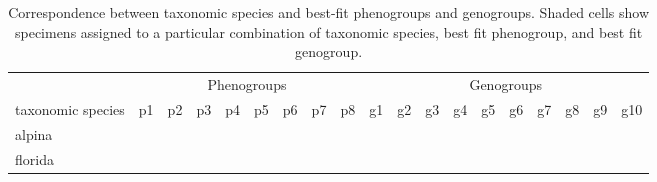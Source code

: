 \documentclass[
  11pt,
]{article}
\begin{document}
\begin{table}[H]

\caption{\label{tab:cladeVfinalSummary}Correspondence between taxonomic species and best-fit phenogroups and genogroups. Shaded cells show specimens assigned to a particular combination of taxonomic species, best fit phenogroup, and best fit genogroup.}
\centering
\fontsize{8}{10}\selectfont
\begin{tabular}[t]{>{}l|>{}l|>{}l|>{}l|>{}l|>{}l|>{}l|>{}l|>{}l||>{}l|>{}l|>{}l|>{}l|>{}l|>{}l|>{}l|>{}l|>{}l|>{}l|}
\toprule
\multicolumn{1}{c}{} & \multicolumn{8}{c}{Phenogroups} & \multicolumn{10}{c}{Genogroups} \\
\cmidrule(l{3pt}r{3pt}){2-9} \cmidrule(l{3pt}r{3pt}){10-19}
taxonomic species & p1 & p2 & p3 & p4 & p5 & p6 & p7 & p8 & g1 & g2 & g3 & g4 & g5 & g6 & g7 & g8 & g9 & g10\\
\midrule
alpina & \cellcolor[HTML]{FFFFFF}{\textcolor[HTML]{FFFFFF}{0}} & \cellcolor[HTML]{FFFFFF}{\textcolor[HTML]{FFFFFF}{0}} & \cellcolor[HTML]{BBBBBB}{\textcolor[HTML]{BBBBBB}{1}} & \cellcolor[HTML]{FFFFFF}{\textcolor[HTML]{FFFFFF}{0}} & \cellcolor[HTML]{FFFFFF}{\textcolor[HTML]{FFFFFF}{0}} & \cellcolor[HTML]{BBBBBB}{\textcolor[HTML]{BBBBBB}{1}} & \cellcolor[HTML]{BBBBBB}{\textcolor[HTML]{BBBBBB}{1}} & \cellcolor[HTML]{FFFFFF}{\textcolor[HTML]{FFFFFF}{0}} & \cellcolor[HTML]{FFFFFF}{\textcolor[HTML]{FFFFFF}{0}} & \cellcolor[HTML]{BBBBBB}{\textcolor[HTML]{BBBBBB}{1}} & \cellcolor[HTML]{FFFFFF}{\textcolor[HTML]{FFFFFF}{0}} & \cellcolor[HTML]{FFFFFF}{\textcolor[HTML]{FFFFFF}{0}} & \cellcolor[HTML]{FFFFFF}{\textcolor[HTML]{FFFFFF}{0}} & \cellcolor[HTML]{FFFFFF}{\textcolor[HTML]{FFFFFF}{0}} & \cellcolor[HTML]{FFFFFF}{\textcolor[HTML]{FFFFFF}{0}} & \cellcolor[HTML]{FFFFFF}{\textcolor[HTML]{FFFFFF}{0}} & \cellcolor[HTML]{BBBBBB}{\textcolor[HTML]{BBBBBB}{1}} & \cellcolor[HTML]{BBBBBB}{\textcolor[HTML]{BBBBBB}{1}}\\
\midrule
florida & \cellcolor[HTML]{FFFFFF}{\textcolor[HTML]{FFFFFF}{0}} & \cellcolor[HTML]{FFFFFF}{\textcolor[HTML]{FFFFFF}{0}} & \cellcolor[HTML]{BBBBBB}{\textcolor[HTML]{BBBBBB}{1}} & \cellcolor[HTML]{FFFFFF}{\textcolor[HTML]{FFFFFF}{0}} & \cellcolor[HTML]{FFFFFF}{\textcolor[HTML]{FFFFFF}{0}} & \cellcolor[HTML]{BBBBBB}{\textcolor[HTML]{BBBBBB}{1}} & \cellcolor[HTML]{FFFFFF}{\textcolor[HTML]{FFFFFF}{0}} & \cellcolor[HTML]{FFFFFF}{\textcolor[HTML]{FFFFFF}{0}} & \cellcolor[HTML]{FFFFFF}{\textcolor[HTML]{FFFFFF}{0}} & \cellcolor[HTML]{FFFFFF}{\textcolor[HTML]{FFFFFF}{0}} & \cellcolor[HTML]{FFFFFF}{\textcolor[HTML]{FFFFFF}{0}} & \cellcolor[HTML]{FFFFFF}{\textcolor[HTML]{FFFFFF}{0}} & \cellcolor[HTML]{BBBBBB}{\textcolor[HTML]{BBBBBB}{1}} & \cellcolor[HTML]{FFFFFF}{\textcolor[HTML]{FFFFFF}{0}} & \cellcolor[HTML]{BBBBBB}{\textcolor[HTML]{BBBBBB}{1}} & \cellcolor[HTML]{BBBBBB}{\textcolor[HTML]{BBBBBB}{1}} & \cellcolor[HTML]{FFFFFF}{\textcolor[HTML]{FFFFFF}{0}} & \cellcolor[HTML]{FFFFFF}{\textcolor[HTML]{FFFFFF}{0}}\\

\end{tabular}
\end{table}
\end{document}
